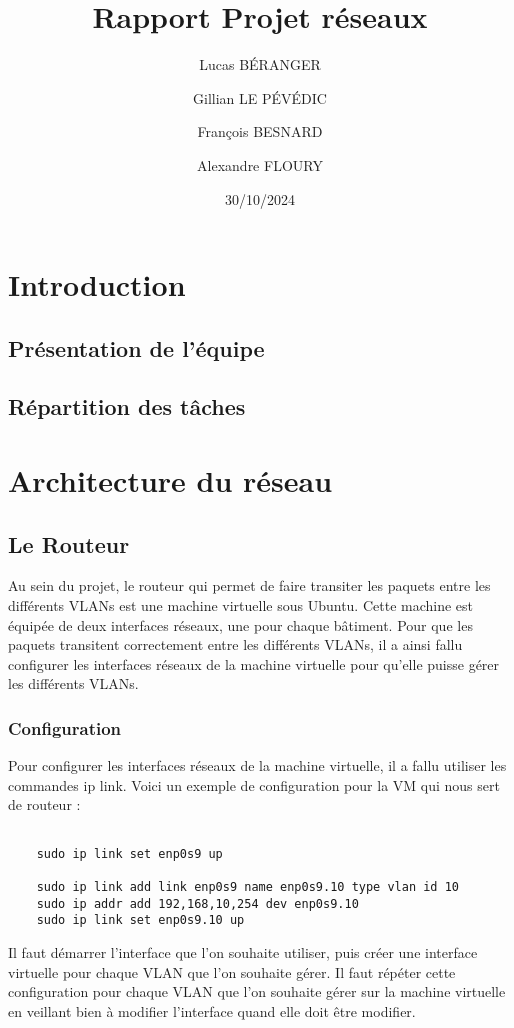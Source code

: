 \documentclass[a4paper,12pt]{report}
\title{Rapport Projet réseaux}
\author{
    Lucas BÉRANGER \and 
    Gillian LE PÉVÉDIC \and
    François BESNARD \and
    Alexandre FLOURY \and
}
\date{30/10/2024}
\begin{document}
    \maketitle  
    \newpage

    \tableofcontents
    \newpage

    \chapter{Introduction}
        \section{Présentation de l'équipe}
        \section{Répartition des tâches}


    \chapter{Architecture du réseau}
        \section{Le Routeur}
        Au sein du projet, le routeur qui permet de faire transiter les paquets entre les différents VLANs est une machine virtuelle sous Ubuntu. Cette machine est équipée de deux interfaces réseaux, une pour chaque bâtiment. Pour que les paquets transitent correctement entre les différents VLANs, il a ainsi fallu configurer les interfaces réseaux de la machine virtuelle pour qu'elle puisse gérer les différents VLANs.
            \subsection{Configuration}
            Pour configurer les interfaces réseaux de la machine virtuelle, il a fallu utiliser les commandes ip link. Voici un exemple de configuration pour la VM qui nous sert de routeur :

            \begin{verbatim}
    
    sudo ip link set enp0s9 up

    sudo ip link add link enp0s9 name enp0s9.10 type vlan id 10 
    sudo ip addr add 192,168,10,254 dev enp0s9.10 
    sudo ip link set enp0s9.10 up
            \end{verbatim}
            Il faut démarrer l'interface que l'on souhaite utiliser, puis créer une interface virtuelle pour chaque VLAN que l'on souhaite gérer. Il faut répéter cette configuration pour chaque VLAN que l'on souhaite gérer sur la machine virtuelle en veillant bien à modifier l'interface quand elle doit être modifier. 
\end{document}
